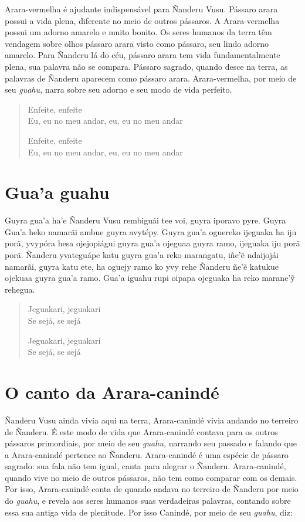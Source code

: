  Arara-vermelha é ajudante indispensável para Ñanderu Vusu. Pássaro
arara possui a vida plena, diferente no meio de outros pássaros. A
Arara-vermelha possui um adorno amarelo e muito bonito. Os seres humanos
da terra têm vendagem sobre olhos pássaro arara visto como pássaro, seu
lindo adorno amarelo. Para Ñanderu lá do céu, pássaro arara tem vida
fundamentalmente plena, sua palavra não se compara. Pássaro sagrado,
quando desce na terra, as palavras de Ñanderu aparecem como pássaro
arara. Arara-vermelha, por meio de seu \emph{guahu,} narra sobre seu
adorno e seu modo de vida perfeito.

\begin{verse}
Enfeite, enfeite\\
Eu, eu no meu andar, eu, eu no meu andar

Enfeite, enfeite\\
Eu, eu no meu andar, eu, eu no meu andar
\end{verse}

\chapter{Gua'a guahu}

Guyra gua'a ha'e Ñanderu Vusu rembiguái tee voi, guyra iporavo pyre.
Guyra Gua'a heko namarãi ambue guyra avytépy. Guyra gua'a oguereko
ijeguaka ha iju porã, yvypóra hesa ojejopiágui guyra gua'a ojeguaa guyra
ramo, ijeguaka iju porã porã. Ñanderu yvateguápe katu guyra gua'a reko
marangatu, iñe'ẽ ndaijojái namarãi, guyra katu ete, ha oguejy ramo ko
yvy rehe Ñanderu ñe'ẽ katukue ojekuaa guyra gua'a ramo. Gua'a iguahu
rupi oipapa ojeguaka ha reko marane'ỹ rehegua.

\begin{verse}
Jeguakari, jeguakari\\
Se sejá, se sejá

Jeguakari, jeguakari\\
Se sejá, se sejá
\end{verse}

\chapter{O canto da Arara-canindé}

 Ñanderu Vusu ainda vivia aqui na terra, Arara-canindé vivia
andando no terreiro de Ñanderu. É este modo de vida que Arara-canindé
contava para os outros pássaros primordiais, por meio de seu
\emph{guahu,} narrando seu passado e falando que a Arara-canindé
pertence ao Ñanderu. Arara-canindé é uma espécie de pássaro sagrado: sua
fala não tem igual, canta para alegrar o Ñanderu. Arara-canindé, quando
vive no meio de outros pássaros, não tem como comparar com os demais.
Por isso, Arara-canindé conta de quando andava no terreiro de Ñanderu
por meio do \emph{guahu}, e revela aos seres humanos suas verdadeiras
palavras, contando sobre essa sua antiga vida de plenitude. Por isso
Canindé, por meio de seu \emph{guahu}, diz:

